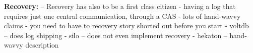 {\bf Recovery:} 
-- Recovery has also to be a first class citizen
- having a log that requires just one central communication, through a CAS
- lots of hand-wavvy claims
- you need to have to recovery story shorted out before you start
- voltdb -- does log shipping
- silo -- does not even implement recovery
- hekaton -- hand-wavvy description

